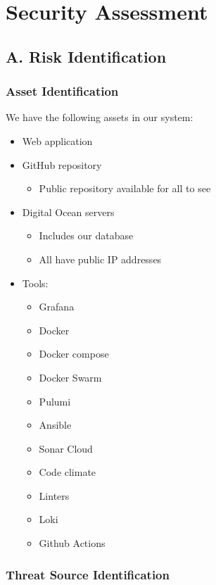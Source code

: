\section{Security Assessment}
\label{appendix:security}
\subsection{A. Risk Identification}

\subsubsection{Asset Identification}

We have the following assets in our system:

\begin{itemize}
    \item Web application
    \item GitHub repository
    \begin{itemize}
        \item Public repository available for all to see
    \end{itemize}
    \item Digital Ocean servers
    \begin{itemize}
        \item Includes our database
        \item All have public IP addresses
    \end{itemize}

    \item Tools:
    \begin{itemize}
        \item Grafana
        \item Docker
        \item Docker compose
        \item Docker Swarm
        \item Pulumi
        \item Ansible
        \item Sonar Cloud
        \item Code climate
        \item Linters
        \item Loki
        \item Github Actions
    \end{itemize}
\end{itemize}

\subsubsection{Threat Source Identification}


